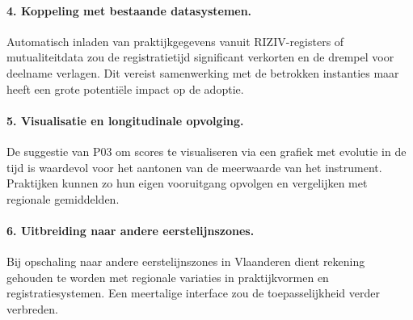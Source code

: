 \paragraph{4. Koppeling met bestaande datasystemen.}
Automatisch inladen van praktijkgegevens vanuit RIZIV-registers of mutualiteitdata zou de registratietijd significant verkorten en de drempel voor deelname verlagen.
Dit vereist samenwerking met de betrokken instanties maar heeft een grote potentiële impact op de adoptie.
 
\paragraph{5. Visualisatie en longitudinale opvolging.}
De suggestie van P03 om scores te visualiseren via een grafiek met evolutie in de tijd is waardevol voor het aantonen van de meerwaarde van het instrument.
Praktijken kunnen zo hun eigen vooruitgang opvolgen en vergelijken met regionale gemiddelden.
 
\paragraph{6. Uitbreiding naar andere eerstelijnszones.}
Bij opschaling naar andere eerstelijnszones in Vlaanderen dient rekening gehouden te worden met regionale variaties in praktijkvormen en registratiesystemen.
Een meertalige interface zou de toepasselijkheid verder verbreden.
